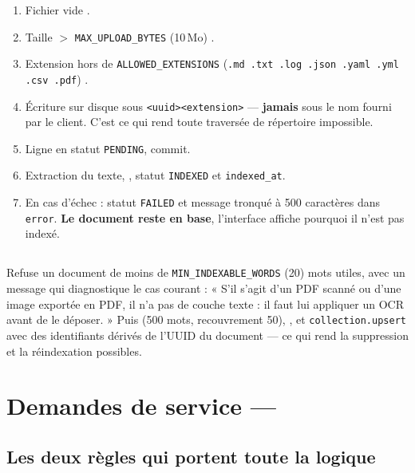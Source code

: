 \begin{enumerate}
  \item Fichier vide \arrowto{} .
  \item Taille \(>\) \texttt{MAX\_UPLOAD\_BYTES} (10\,Mo) \arrowto{}
  .
  \item Extension hors de \texttt{ALLOWED\_EXTENSIONS}
  (\texttt{.md .txt .log .json .yaml .yml .csv .pdf}) \arrowto{}
  .
  \item Écriture sur disque sous \texttt{<uuid><extension>} --- \textbf{jamais}
  sous le nom fourni par le client. C'est ce qui rend toute traversée de
  répertoire impossible.
  \item Ligne  en statut \texttt{PENDING}, commit.
  \item Extraction du texte, , statut \texttt{INDEXED} et
  \texttt{indexed\_at}.
  \item En cas d'échec : statut \texttt{FAILED} et message tronqué à 500
  caractères dans \texttt{error}. \textbf{Le document reste en base}, l'interface
  affiche pourquoi il n'est pas indexé.
\end{enumerate}

\subsection*{}
Refuse un document de moins de \texttt{MIN\_INDEXABLE\_WORDS} (20) mots utiles,
avec un message qui diagnostique le cas courant : « S'il s'agit d'un PDF scanné
ou d'une image exportée en PDF, il n'a pas de couche texte : il faut lui
appliquer un OCR avant de le déposer. » Puis  (500 mots,
recouvrement 50), , et \texttt{collection.upsert} avec des
identifiants dérivés de l'UUID du document --- ce qui rend la suppression et la
réindexation possibles.

\section{Demandes de service --- }

\subsection*{Les deux règles qui portent toute la logique}


